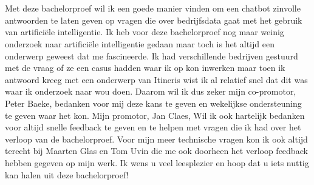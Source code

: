 
\chapter*{}%
\label{ch:voorwoord}


Met deze bachelorproef wil ik een goede manier vinden om een chatbot zinvolle antwoorden te laten geven op vragen die over bedrijfsdata gaat met het gebruik van artificiële intelligentie. Ik heb voor deze bachelorproef nog maar weinig onderzoek naar artificiële intelligentie gedaan maar toch is het altijd een onderwerp geweest dat me fascineerde. 
Ik had verschillende bedrijven gestuurd met de vraag of ze een casus hadden waar ik op kon inwerken maar toen ik antwoord kreeg met een onderwerp van Itineris wist ik al relatief snel dat dit was waar ik onderzoek naar wou doen. Daarom wil ik dus zeker mijn co-promotor, Peter Baeke, bedanken voor mij deze kans te geven en wekelijkse ondersteuning te geven waar het kon. Mijn promotor, Jan Claes, Wil ik ook hartelijk bedanken voor altijd snelle feedback te geven en te helpen met vragen die ik had over het verloop van de bachelorproef. Voor mijn meer technische vragen kon ik ook altijd terecht bij Maarten Glas en Tom Uvin die me ook doorheen het verloop feedback hebben gegeven op mijn werk. 
Ik wens u veel leesplezier en hoop dat u iets nuttig kan halen uit deze bachelorproef!


